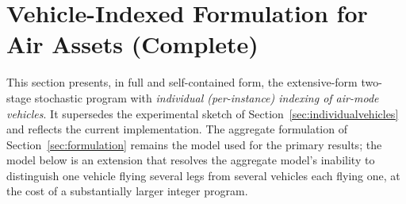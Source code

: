 %
%
%
%

\section{Vehicle-Indexed Formulation for Air Assets (Complete)}
\label{sec:vif}

This section presents, in full and self-contained form, the extensive-form
two-stage stochastic program with \emph{individual (per-instance) indexing of
air-mode vehicles}. It supersedes the experimental sketch of
Section~\ref{sec:individualvehicles} and reflects the current implementation.
The aggregate formulation of Section~\ref{sec:formulation} remains the model
used for the primary results; the model below is an extension that resolves
the aggregate model's inability to distinguish one vehicle flying several legs
from several vehicles each flying one, at the cost of a substantially larger
integer program.

